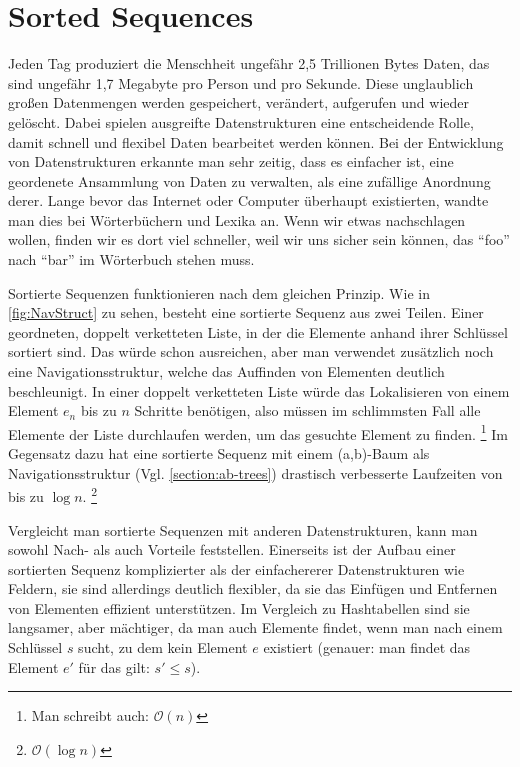 
\chapter{Sorted Sequences}

Jeden Tag produziert die Menschheit ungefähr 2,5 Trillionen Bytes Daten, das sind ungefähr 1,7 Megabyte pro Person und pro Sekunde.\cite{techjury:20} Diese unglaublich großen Datenmengen werden gespeichert, verändert, aufgerufen und wieder gelöscht. Dabei spielen ausgreifte Datenstrukturen eine entscheidende Rolle, damit schnell und flexibel Daten bearbeitet werden können. Bei der Entwicklung von Datenstrukturen erkannte man sehr zeitig, dass es einfacher ist, eine geordenete Ansammlung von Daten zu verwalten, als eine zufällige Anordnung derer. Lange bevor das Internet oder Computer überhaupt existierten, wandte man dies bei Wörterbüchern und Lexika an. Wenn wir etwas nachschlagen wollen, finden wir es dort viel schneller, weil wir uns sicher sein können, das "`foo"' nach "`bar"' im Wörterbuch stehen muss.
\par
Sortierte Sequenzen funktionieren nach dem gleichen Prinzip. Wie in \autoref{fig:NavStruct} zu sehen, besteht eine sortierte Sequenz aus zwei Teilen. Einer geordneten, doppelt verketteten Liste, in der die Elemente anhand ihrer Schlüssel sortiert sind. Das würde schon ausreichen, aber man verwendet zusätzlich noch eine Navigationsstruktur, welche das Auffinden von Elementen deutlich beschleunigt. In einer doppelt verketteten Liste würde das Lokalisieren von einem Element $e_n$ bis zu $n$ Schritte benötigen, also müssen im schlimmsten Fall alle Elemente der Liste durchlaufen werden, um das gesuchte Element zu finden. \footnote{Man schreibt auch: $\mathcal{O} (n)$} Im Gegensatz dazu hat eine sortierte Sequenz mit einem (a,b)-Baum als Navigationsstruktur (Vgl. \autoref{section:ab-trees}) drastisch verbesserte Laufzeiten von bis zu $\log n$. \footnote{$\mathcal{O} (\log n)$} \cite{Sanders:19}
\par
Vergleicht man sortierte Sequenzen mit anderen Datenstrukturen, kann man sowohl Nach- als auch Vorteile feststellen. Einerseits ist der Aufbau einer sortierten Sequenz komplizierter als der einfachererer Datenstrukturen wie Feldern, sie sind allerdings deutlich flexibler, da sie das Einfügen und Entfernen von Elementen effizient unterstützen. Im Vergleich zu Hashtabellen sind sie langsamer, aber mächtiger, da man auch Elemente findet, wenn man nach einem Schlüssel $s$ sucht, zu dem kein Element $e$ existiert (genauer: man findet das Element $e'$ für das gilt: $s'\leq s$).

